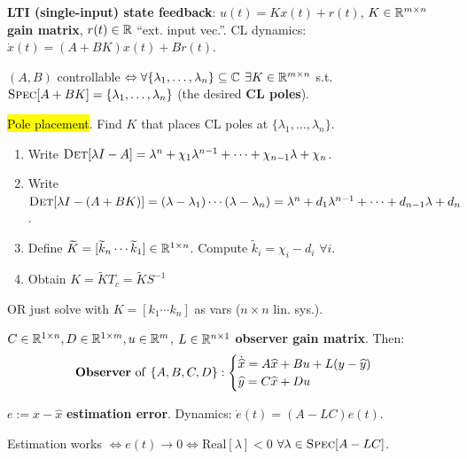 \begin{Definition}
\textbf{LTI (single-input) state feedback}: $u(t)=Kx(t)+r(t)$, $K\in\mathbb R^{m\times n}$ \textbf{gain matrix}, $r(t)\in\mathbb R$ ``ext. input vec.''. CL dynamics: $\dot x(t)=(A+BK)x(t)+Br(t)$.
\end{Definition}
\begin{Theorem}
$(A,B)$ controllable $\Leftrightarrow\forall\{\lambda_1,\ldots,\lambda_n\}\subseteq\mathbb C$ $\exists K\in\mathbb R^{m\times n}$ s.t. $\textsc{Spec}[A+BK]=\{\lambda_1,\ldots,\lambda_n\}$ (the desired \textbf{CL poles}).
\end{Theorem}
\begin{Method}
\hl{Pole placement}. Find $K$ that places CL poles at $\{\lambda_1,\ldots,\lambda_n\}$.
\begin{enumerate}[label=\protect\circled{\arabic*},leftmargin=4mm]
  \item Write $\textsc{Det}[\lambda I-A]=\lambda^n+\chi_1\lambda^{n-1}+\cdots+\chi_{n-1}\lambda+\chi_n$.
  \item Write $\textsc{Det}[\lambda I-(A+BK)]=(\lambda-\lambda_1)\cdots(\lambda-\lambda_n)=\lambda^n+d_1\lambda^{n-1}+\cdots+d_{n-1}\lambda+d_n$.
  \item Define $\widetilde K=[\widetilde k_n\cdots\widetilde k_1]\in\mathbb R^{1\times n}$. Compute $\widetilde k_i=\chi_i-d_i$ $\forall i$.
  \item Obtain $K=\widetilde KT_c=\widetilde KS^{-1}$ \QED
\end{enumerate}
OR just solve  with $K=[k_1\cdots k_n]$ as vars ($n\times n$ lin. sys.).
\end{Method}





\begin{Definition}
$C\in\mathbb R^{1\times n},D\in\mathbb R^{1\times m},u\in \mathbb R^m$, $L\in\mathbb R^{n\times 1}$ \textbf{observer gain matrix}. Then:
\begin{equation*}
\textbf{Observer\textnormal{ of }}\{A,B,C,D\}:\begin{cases}
\dot{\widehat x}=A\widehat x+Bu+L(y-\widehat y) \\
\widehat y=C\widehat x+Du
\end{cases}
\end{equation*}
\end{Definition}
\begin{Definition}
$e:=x-\widehat x$ \textbf{estimation error}. Dynamics: $\dot e(t)=(A-LC)e(t)$.
\end{Definition}
\begin{Theorem}
Estimation works $\Leftrightarrow e(t)\to 0\Leftrightarrow\text{Real}[\lambda]<0$ $\forall\lambda\in\textsc{Spec}[A-LC]$.
\end{Theorem}

